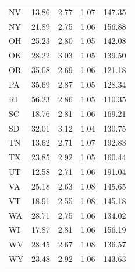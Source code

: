 \documentclass[11pt]{article}
\begin{document}
\begin{multicols}{2}
\begin{table}[htbp]
\begin{tabular}{ l r r r r }
	NV    & 13.86                       & 2.77                 & 1.07         & 147.35                    \\
	NY    & 21.89                       & 2.75                 & 1.06         & 156.88                    \\
	OH    & 25.23                       & 2.80                 & 1.05         & 142.08                    \\
	OK    & 28.22                       & 3.03                 & 1.05         & 139.50                    \\
	OR    & 35.08                       & 2.69                 & 1.06         & 121.18                    \\
	PA    & 35.69                       & 2.87                 & 1.05         & 128.34                    \\
	RI    & 56.23                       & 2.86                 & 1.05         & 110.35                    \\
	SC    & 18.76                       & 2.81                 & 1.06         & 169.21                    \\
	SD    & 32.01                       & 3.12                 & 1.04         & 130.75                    \\
	TN    & 13.62                       & 2.71                 & 1.07         & 192.83                    \\
	TX    & 23.85                       & 2.92                 & 1.05         & 160.44                    \\
	UT    & 12.58                       & 2.71                 & 1.06         & 191.04                    \\
	VA    & 25.18                       & 2.63                 & 1.08         & 145.65                    \\
	VT    & 18.91                       & 2.55                 & 1.08         & 145.18                    \\
	WA    & 28.71                       & 2.75                 & 1.06         & 134.02                    \\
	WI    & 17.87                       & 2.81                 & 1.06         & 156.19                    \\
	WV    & 28.45                       & 2.67                 & 1.08         & 136.57                    \\
	WY    & 23.48                       & 2.92                 & 1.06         & 143.63                    \\
	\bottomrule
\end{tabular}
\end{table}


\end{multicols}
\end{document}
